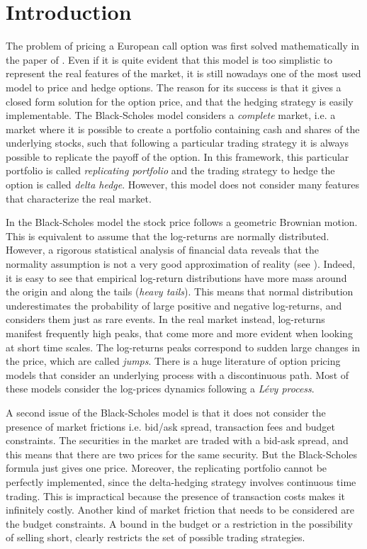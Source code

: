 

\chapter{Introduction}\label{Introd}
\minitoc%


\vspace{5em}

The problem of pricing a European call option was first solved mathematically in the paper of \cite{BS73}. 
Even if it is quite evident that this model is too simplistic to represent the real features of the market, it is 
still nowadays one of the most used model to price and hedge options.
The reason for its success is that it gives a closed form solution for the option price, and that the hedging strategy is easily 
implementable.
The Black-Scholes model considers a \emph{complete} market, i.e. a market where it is possible to create a portfolio containing cash 
and shares of the underlying stocks, such that following a particular trading strategy it is always possible to replicate
the payoff of the option. In this framework, this particular portfolio is called \emph{replicating portfolio} and
the trading strategy to hedge the option is called \emph{delta hedge}.
However, this model does not consider many features that characterize the real market. 

In the Black-Scholes model 
the stock price follows a geometric Brownian motion. This is equivalent to assume that the log-returns are 
normally distributed. 
However, a rigorous statistical analysis of financial data
reveals that the normality assumption is not a very good approximation of
reality (see \cite{Cont01}). Indeed, it is easy to see that empirical log-return distributions have
more mass around the origin and along the tails (\emph{heavy tails}).
This means that normal distribution underestimates the probability of large positive and negative
log-returns, and considers them just as rare events. In the real market instead,
log-returns manifest frequently high peaks, that come more and more evident
when looking at short time scales. The log-returns peaks correspond to sudden
large changes in the price, which are called \emph{jumps}. 
There is a huge literature of option pricing models that consider an underlying process with a discontinuous path.
Most of these models consider the log-prices dynamics following a \emph{Lévy process}. 
 

A second issue of the Black-Scholes model is that it does not consider the presence of market frictions i.e.
bid/ask spread, transaction fees and budget constraints.
The securities in the market are traded with a bid-ask spread, and this means that there are two prices for the
same security. But the Black-Scholes formula just gives one price.
Moreover, the replicating portfolio cannot be perfectly implemented,
since the delta-hedging strategy involves continuous time trading. 
This is impractical because the presence of transaction costs makes it infinitely costly.
Another kind of market friction that needs to be considered are the budget constraints. 
A bound in the budget or a restriction in the possibility of 
selling short, clearly restricts the set of possible trading strategies.

